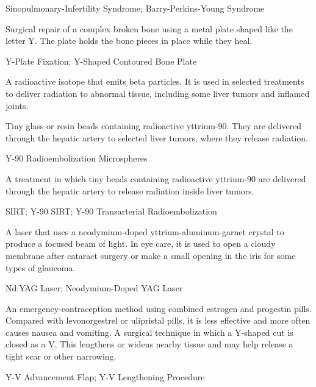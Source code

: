 \synonyms
Sinopulmonary-Infertility Syndrome; Barry-Perkins-Young Syndrome

 Surgical repair of a complex broken bone using a metal plate shaped like the letter Y. The plate holds the bone pieces in place while they heal.

\synonyms
Y-Plate Fixation; Y-Shaped Contoured Bone Plate

 A radioactive isotope that emits beta particles. It is used in selected treatments to deliver radiation to abnormal tissue, including some liver tumors and inflamed joints.

 Tiny glass or resin beads containing radioactive yttrium-90. They are delivered through the hepatic artery to selected liver tumors, where they release radiation.

\synonyms
Y-90 Radioembolization Microspheres

 A treatment in which tiny beads containing radioactive yttrium-90 are delivered through the hepatic artery to release radiation inside liver tumors.

\synonyms
SIRT; Y-90 SIRT; Y-90 Transarterial Radioembolization

 A laser that uses a neodymium-doped yttrium-aluminum-garnet crystal to produce a focused beam of light. In eye care, it is used to open a cloudy membrane after cataract surgery or make a small opening in the iris for some types of glaucoma.

\synonyms
Nd:YAG Laser; Neodymium-Doped YAG Laser

 An emergency-contraception method using combined estrogen and progestin pills. Compared with levonorgestrel or ulipristal pills, it is less effective and more often causes nausea and vomiting.
 A surgical technique in which a Y-shaped cut is closed as a V. This lengthens or widens nearby tissue and may help release a tight scar or other narrowing.

\synonyms
Y-V Advancement Flap; Y-V Lengthening Procedure
